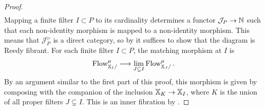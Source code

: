 \documentclass[10pt]{amsart}
\numberwithin{equation}{section}
\theoremstyle{definition}
\newcommand{\PreFlow}{\mathrm{Flow}\vphantom{w}}
\newcommand{\bN}{\mathbb{N}}
\newcommand{\bX}{\mathbb{X}}
\newcommand{\cJ}{\mathcal{J}}
\renewcommand{\to}{\mathchoice{\longrightarrow}{\rightarrow}{}{}}
\begin{document}
\begin{proof}
\begin{align*}
	\end{align*}
	Mapping a finite filter $I\subset P$ to its cardinality determines a functor $\cJ_{P} \to \bN$ such that each non-identity morphism is mapped to a non-identity morphism.
  This means that $\cJ_{P}^{\triangleright}$ is a direct category, so by  it suffices to show that the diagram is Reedy fibrant.
  For each finite filter $I\subset P$, the matching morphism at $I$ is
	\begin{align*}
		\PreFlow^{\mu}_{\bX_{I}/} \to \lim_{J\subsetneq I} \PreFlow^{\mu}_{\bX_{J}/} \,.
	\end{align*}
	By an argument similar to the first part of this proof, this morphism is given by composing with the companion of the inclusion $\bX_{K}\to \bX_{I}$, where $K$ is the union of all proper filters $J\subsetneq I$.
  This is an inner fibration by .
\end{proof}
\end{document}
